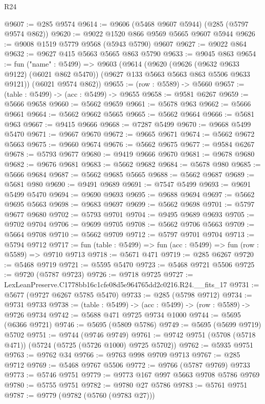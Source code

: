 \begin{lexlean}{R24}
\begin{coremodule}
@9607 := @285 @9574
@9614 := @9606 (@5468 @9607 @5944) (@285 (@5797 @9574 @862))
@9620 := @9022 @1520 @866 @9569 @5665 @9607 @5944
@9626 := @9008 @1519 @5779 @9568 (@5943 @5790) @9607
@9627 := @9022 @864
@9632 := @9627 @415 @5663 @5665 @863 @5790
@9633 := @9045 @863
@9654 := fun ("name" : @5499) =>
  @9603
    (@9614
      (@9620
        (@9626 (@9632 @9633 @9122) (@6021 @862 @5470))
        (@9627 @133 @5663 @5663 @863 @5506 @9633 @9121))
      (@6021 @9574 @862))
@9655 := (row : @5589) -> @5660
@9657 := (table : @5499) -> (acc : @5499) -> @9655
@9658 := @9581 @6267
@9659 := @5666 @9658
@9660 := @5662 @9659
@9661 := @5678 @963
@9662 := @5666 @9661
@9664 := @5662 @9662 @5665
@9665 := @5662 @9664
@9666 := @5681 @963
@9667 := @9415 @9666
@9668 := @7287 @5499
@9670 := @9668 @5499 @5470
@9671 := @9667 @9670
@9672 := @9665 @9671
@9674 := @5662 @9672 @5663
@9675 := @9660 @9674
@9676 := @5662 @9675
@9677 := @9584 @6267
@9678 := @5793 @9677
@9680 := @9419 @9666 @9670
@9681 := @9678 @9680
@9682 := @9676 @9681
@9683 := @5662 @9682
@9684 := @5678 @980
@9685 := @5666 @9684
@9687 := @5662 @9685 @5665
@9688 := @5662 @9687
@9689 := @5681 @980
@9690 := @9491 @9689
@9691 := @7547 @5499
@9693 := @9691 @5499 @5470
@9694 := @9690 @9693
@9695 := @9688 @9694
@9697 := @5662 @9695 @5663
@9698 := @9683 @9697
@9699 := @5662 @9698
@9701 := @5797 @9677 @9680
@9702 := @5793 @9701
@9704 := @9495 @9689 @9693
@9705 := @9702 @9704
@9706 := @9699 @9705
@9708 := @5662 @9706 @5663
@9709 := @5664 @9708
@9710 := @5662 @9709
@9712 := @5797 @9701 @9704
@9713 := @5794 @9712
@9717 := fun (table : @5499) => fun (acc : @5499) => fun (row : @5589) => @9710 @9713
@9718 := @5671 @471
@9719 := @285 @6267
@9720 := @5468 @9719
@9721 := @5595 @5470
@9723 := @5468 @9721 @5506
@9725 := @9720 (@5787 @9723)
@9726 := @9718 @9725
@9727 := LexLeanPreserve.C1778bb16c1cfe08d5e964765dd2c0216.R24.__fits_17
@9731 := @5677 (@9727 @6267 @5785 @5470)
@9733 := @285 (@5798 @9712)
@9734 := @9731 @9733
@9738 := (table : @5499) -> (acc : @5499) -> (row : @5589) -> @9726 @9734
@9742 := @5688 @471 @9725 @9734 @1000
@9744 := @5695 (@6366 @9721)
@9746 := @5695 (@5809 @5786)
@9749 := @5695 (@5699 @9719) @5702
@9751 := @9744 (@9746 @9749)
@9761 := @9742 @9751 (@5708 (@5718 @471)) (@5724 (@5725 (@5726 @1000) @9725 @5702))
@9762 := @5935 @9751
@9763 := @9762 @34
@9766 := @9763 @998 @9709 @9713
@9767 := @285 @9712
@9769 := @5468 @9767 @5506
@9772 := @9766 (@5787 @9769) @9733
@9773 := @5746 @9751
@9779 := @9773 @167 @997 @5663 @9708 @5786 @9769
@9780 := @5755 @9751
@9782 := @9780 @27 @5786
@9783 := @5761 @9751
@9787 := @9779 (@9782 (@5760 (@9783 @27)))

\end{coremodule}
\end{lexlean}
